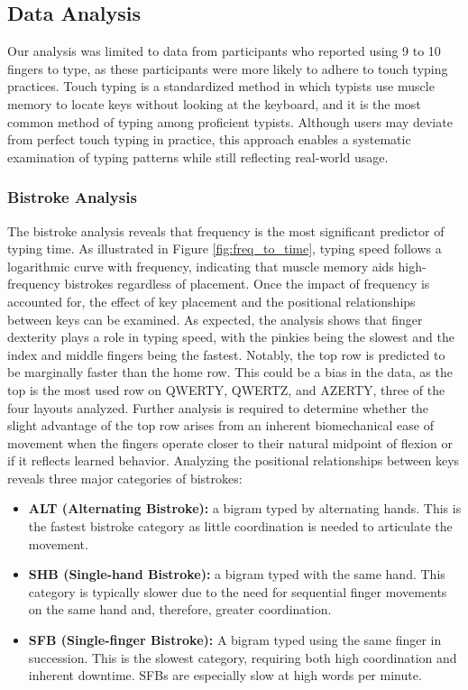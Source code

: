 \subsection{Data Analysis}
Our analysis was limited to data from participants who reported using 9 to 10 fingers to type, as these participants were more likely to adhere to touch typing practices. Touch typing is a standardized method in which typists use muscle memory to locate keys without looking at the keyboard, and it is the most common method of typing among proficient typists. Although users may deviate from perfect touch typing in practice, this approach enables a systematic examination of typing patterns while still reflecting real-world usage.

\subsubsection{Bistroke Analysis}
\noindent The bistroke analysis reveals that frequency is the most significant predictor of typing time. As illustrated in Figure \ref{fig:freq_to_time}, typing speed follows a logarithmic curve with frequency, indicating that muscle memory aids high-frequency bistrokes regardless of placement. Once the impact of frequency is accounted for, the effect of key placement and the positional relationships between keys can be examined. As expected, the analysis shows that finger dexterity plays a role in typing speed, with the pinkies being the slowest and the index and middle fingers being the fastest. Notably, the top row is predicted to be marginally faster than the home row. This could be a bias in the data, as the top is the most used row on QWERTY, QWERTZ, and AZERTY, three of the four layouts analyzed. Further analysis is required to determine whether the slight advantage of the top row arises from an inherent biomechanical ease of movement when the fingers operate closer to their natural midpoint of flexion or if it reflects learned behavior. Analyzing the positional relationships between keys reveals three major categories of bistrokes:

\begin{itemize}
  \item \textbf{ALT (Alternating Bistroke):} a bigram typed by alternating hands. This is the fastest bistroke category as little coordination is needed to articulate the movement.
\item \textbf{SHB (Single-hand Bistroke):} a bigram typed with the same hand. This category is typically slower due to the need for sequential finger movements on the same hand and, therefore, greater coordination.
\item \textbf{SFB (Single-finger Bistroke):} A bigram typed using the same finger in succession. This is the slowest category, requiring both high coordination and inherent downtime. SFBs are especially slow at high words per minute.
\end{itemize}

